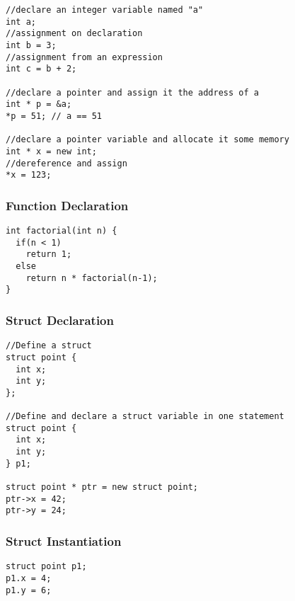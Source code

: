 \documentclass[a4paper,11pt]{article}
\begin{document}
\begin{lstlisting}
//declare an integer variable named "a"
int a;
//assignment on declaration
int b = 3;
//assignment from an expression
int c = b + 2;

//declare a pointer and assign it the address of a
int * p = &a;
*p = 51; // a == 51

//declare a pointer variable and allocate it some memory
int * x = new int;
//dereference and assign
*x = 123;
\end{lstlisting}

\subsubsection{Function Declaration}

\begin{lstlisting}
int factorial(int n) {
  if(n < 1)
    return 1;
  else
    return n * factorial(n-1);
}
\end{lstlisting}

\subsubsection{Struct Declaration}

\begin{lstlisting}
//Define a struct
struct point {
  int x;
  int y;
};

//Define and declare a struct variable in one statement
struct point {
  int x;
  int y;
} p1;

struct point * ptr = new struct point;
ptr->x = 42;
ptr->y = 24;
\end{lstlisting}

\subsubsection{Struct Instantiation}

\begin{lstlisting}
struct point p1;
p1.x = 4;
p1.y = 6;
\end{lstlisting}
\end{document}
